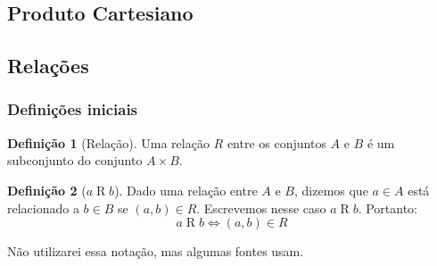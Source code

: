 \documentclass{article}
\theoremstyle{plain}
\theoremstyle{definition}
\newtheorem{definicao}{Definição}[section]
\theoremstyle{remark}
\begin{document}
\subsection{Produto Cartesiano}
\subsection{Relações}
\subsubsection{Definições iniciais}
\begin{definicao}[Relação]
	Uma relação $R$ entre os conjuntos $A$ e $B$ é um subconjunto do conjunto $A\times B$.
\end{definicao}
\begin{definicao}[$a\mathrel{R}b$]
	Dado uma relação entre $A$ e $B$, dizemos que $a\in A$ está relacionado a $b\in B$ se $(a,b) \in R$. Escrevemos nesse caso $a\mathrel{R}b$. Portanto:
	$$ a\mathrel{R}b \iff  (a,b) \in R$$

	Não utilizarei essa notação, mas algumas fontes usam.
\end{definicao}
\end{document}
